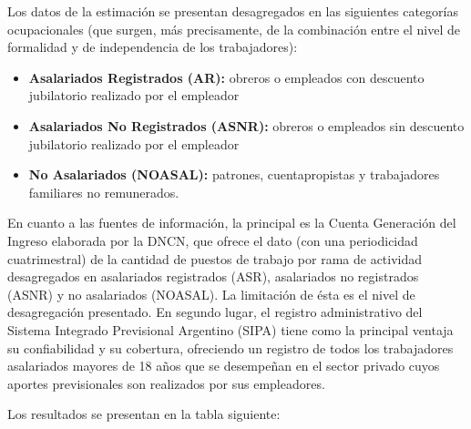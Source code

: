 \documentclass[
  openany]{book}
\providecommand{\tightlist}{%
  \setlength{\itemsep}{0pt}\setlength{\parskip}{0pt}}
\begin{document}
Los datos de la estimación se presentan desagregados en las siguientes categorías ocupacionales (que surgen, más precisamente, de la combinación entre el nivel de formalidad y de independencia de los trabajadores):

\begin{itemize}
\tightlist
\item
  \textbf{Asalariados Registrados (AR):} obreros o empleados con descuento jubilatorio realizado por el empleador
\item
  \textbf{Asalariados No Registrados (ASNR):} obreros o empleados sin descuento jubilatorio realizado por el empleador
\item
  \textbf{No Asalariados (NOASAL):} patrones, cuentapropistas y trabajadores familiares no remunerados.
\end{itemize}

En cuanto a las fuentes de información, la principal es la Cuenta Generación del Ingreso elaborada por la DNCN, que ofrece el dato (con una periodicidad cuatrimestral) de la cantidad de puestos de trabajo por rama de actividad desagregados en asalariados registrados (ASR), asalariados no registrados (ASNR) y no asalariados (NOASAL). La limitación de ésta es el nivel de desagregación presentado. En segundo lugar, el registro administrativo del Sistema Integrado Previsional Argentino (SIPA) tiene como la principal ventaja su confiabilidad y su cobertura, ofreciendo un registro de todos los trabajadores asalariados mayores de 18 años que se desempeñan en el sector privado cuyos aportes previsionales son realizados por sus empleadores.

Los resultados se presentan en la tabla siguiente:
\end{document}
